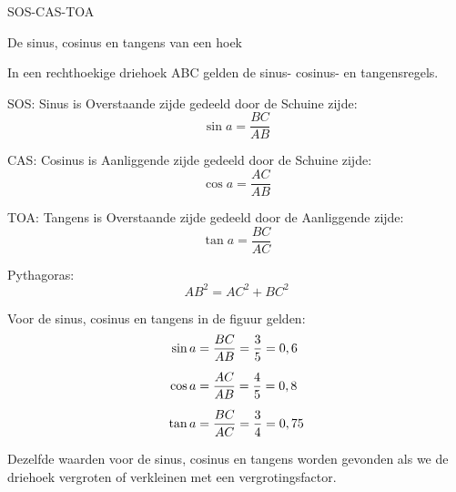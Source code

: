 \documentclass[12pt,fleqn]{article}
\begin{document}
\begin{center}
\huge SOS-CAS-TOA

\large De sinus, cosinus en tangens van een hoek
\end{center}

\vspace*{1cm}

In een rechthoekige driehoek ABC gelden de sinus- cosinus- en tangensregels.

\begin{figure}[!h]
\centering
{}
\end{figure}

SOS: Sinus is Overstaande zijde gedeeld door de Schuine zijde:
\begin{equation}
\boxed{\sin a = \dfrac{BC}{AB}}
\end{equation}

CAS: Cosinus is Aanliggende zijde gedeeld door de Schuine zijde:
\begin{equation}
\boxed{\cos a = \dfrac{AC}{AB}}
\end{equation}

TOA: Tangens is Overstaande zijde gedeeld door de Aanliggende zijde:
\begin{equation}
\boxed{\tan a = \dfrac{BC}{AC}}
\end{equation}

Pythagoras:
\begin{equation}
\boxed{AB^2 = AC^2 + BC^2}
\end{equation}

Voor de sinus, cosinus en tangens in de figuur gelden:
\begin{equation}
\jot=8pt
\begin{split}
\sin a &= \dfrac{BC}{AB} = \dfrac{3}{5} = 0,6 \\
\cos a &= \dfrac{AC}{AB} = \dfrac{4}{5} = 0,8 \\
\tan a &= \dfrac{BC}{AC} = \dfrac{3}{4} = 0,75
\end{split}
\end{equation}

Dezelfde waarden voor de sinus, cosinus en tangens worden gevonden als we de driehoek vergroten of verkleinen met een vergrotingsfactor.
\end{document}
